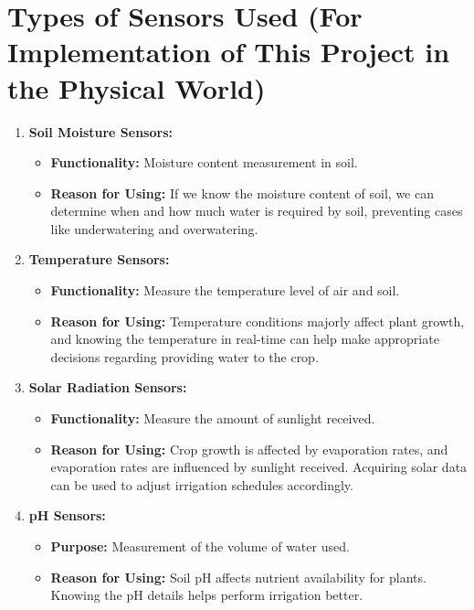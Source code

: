 \documentclass{article}
\begin{document}
    \section{Types of Sensors Used (For Implementation of This Project in the Physical World)}
\begin{enumerate}
    \item \textbf{Soil Moisture Sensors:}
    \begin{itemize}
        \item \textbf{Functionality:} Moisture content measurement in soil.
        \item \textbf{Reason for Using:} If we know the moisture content of soil, we can determine when and how much water is required by soil, preventing cases like underwatering and overwatering.
    \end{itemize}
    
    \item \textbf{Temperature Sensors:}
    \begin{itemize}
        \item \textbf{Functionality:} Measure the temperature level of air and soil.
        \item \textbf{Reason for Using:} Temperature conditions majorly affect plant growth, and knowing the temperature in real-time can help make appropriate decisions regarding providing water to the crop.
    \end{itemize}
    
   
    
    \item \textbf{Solar Radiation Sensors:}
    \begin{itemize}
        \item \textbf{Functionality:} Measure the amount of sunlight received.
        \item \textbf{Reason for Using:} Crop growth is affected by evaporation rates, and evaporation rates are influenced by sunlight received. Acquiring solar data can be used to adjust irrigation schedules accordingly.
    \end{itemize}
    
    \item \textbf{pH Sensors:}
    \begin{itemize}
        \item \textbf{Purpose:} Measurement of the volume of water used.
        \item \textbf{Reason for Using:} Soil pH affects nutrient availability for plants. Knowing the pH details helps perform irrigation better.
    \end{itemize}
    
    
\end{enumerate}
\end{document}
